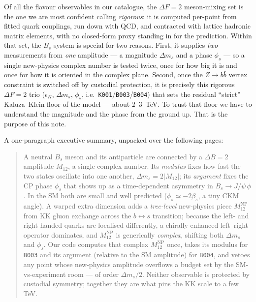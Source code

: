 \documentclass[11pt]{article}
\newcommand{\code}[1]{\texttt{#1}}
\newcommand{\Bs}{B_s}
\newcommand{\dms}{\Delta m_s}
\newcommand{\phis}{\phi_s}
\newcommand{\Mtwelve}{M_{12}}
\newcommand{\MtwelveNP}{M_{12}^{\mathrm{NP}}}
\newcommand{\betas}{\beta_s}
\theoremstyle{definition}
\begin{document}
Of all the flavour observables in our catalogue, the $\Delta F=2$ meson-mixing
set is the one we are most confident calling \emph{rigorous}: it is computed
per-point from fitted quark couplings, run down with QCD, and contracted with
lattice hadronic matrix elements, with no closed-form proxy standing in for the
prediction. Within that set, the $\Bs$ system is special for two reasons. First,
it supplies \emph{two} measurements from \emph{one} amplitude --- a magnitude
$\dms$ and a phase $\phis$ --- so a single new-physics complex number is tested
twice, once for how big it is and once for how it is oriented in the complex
plane. Second, once the $Z\to b\bar b$ vertex constraint is switched off by
custodial protection, it is precisely this rigorous $\Delta F=2$ trio
($\epsilon_K$, $\dms$, $\phis$, i.e.\ \code{K001}/\code{B003}/\code{B004}) that
sets the residual ``strict'' Kaluza--Klein floor of the model --- about
$2$--$3$~TeV. To trust that floor we have to understand the magnitude and the
phase from the ground up. That is the purpose of this note.

A one-paragraph executive summary, unpacked over the following pages:

\begin{quote}
\small
A neutral $\Bs$ meson and its antiparticle are connected by a $\Delta B=2$
amplitude $\Mtwelve$, a single complex number. Its \emph{modulus} fixes how fast
the two states oscillate into one another, $\dms = 2|\Mtwelve|$; its
\emph{argument} fixes the CP phase $\phis$ that shows up as a time-dependent
asymmetry in $\Bs\to J/\psi\,\phi$. In the SM both are small and well predicted
($\phis\simeq -2\betas$, a tiny CKM angle). A warped extra dimension adds a
\emph{tree-level} new-physics piece $\MtwelveNP$ from KK gluon exchange across
the $b\!\leftrightarrow\!s$ transition; because the left- and right-handed quarks
are localised differently, a chirally enhanced left--right operator dominates,
and $\MtwelveNP$ is generically \emph{complex}, shifting both $\dms$ and $\phis$.
Our code computes that complex $\MtwelveNP$ once, takes its modulus for
\code{B003} and its argument (relative to the SM amplitude) for \code{B004}, and
vetoes any point whose new-physics amplitude overflows a budget set by the
SM-vs-experiment room --- of order $\dms/2$. Neither observable is protected by
custodial symmetry; together they are what pins the KK scale to a few TeV.
\end{quote}
\end{document}
